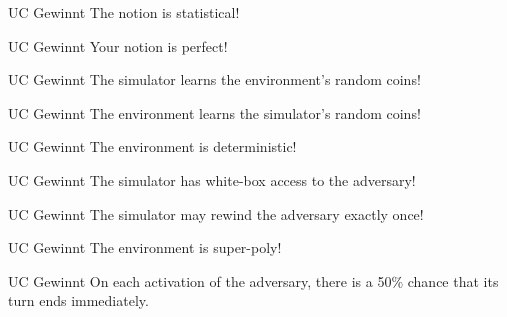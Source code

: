 \documentclass[avery5371,frame,grid]{flashcards}
\begin{document}
\begin{flashcard}{UC Gewinnt}
	The notion is statistical!
\end{flashcard}

\begin{flashcard}{UC Gewinnt}
Your notion is perfect!
\end{flashcard}
\begin{flashcard}{UC Gewinnt}
The simulator learns the environment's random coins!
\end{flashcard}
\begin{flashcard}{UC Gewinnt}
The environment learns the simulator's random coins!
\end{flashcard}
\begin{flashcard}{UC Gewinnt}
The environment is deterministic!
\end{flashcard}
\begin{flashcard}{UC Gewinnt}
The simulator has white-box access to the adversary!
\end{flashcard}
\begin{flashcard}{UC Gewinnt}
The simulator may rewind the adversary exactly once!
\end{flashcard}
\begin{flashcard}{UC Gewinnt}
The environment is super-poly!
\end{flashcard}
\begin{flashcard}{UC Gewinnt}
On each activation of the adversary, there is a 50\% chance that its turn ends immediately. 
\end{flashcard}
\end{document}
